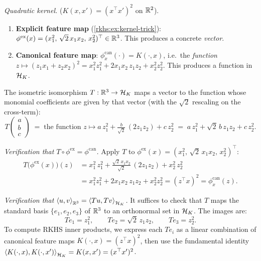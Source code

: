 \begin{notechapter}
\begin{intuition}
\medskip
\emph{Quadratic kernel.}
($K(x,x') = (x^\top x')^2$ on $\mathbb{R}^2$).
\begin{enumerate}
  \item \textbf{Explicit feature map}
    (\cref{rkhs:ex:kernel-trick}):
    $\phi^{\mathrm{ex}}(x) =
    (x_1^2,\, \sqrt{2}\,x_1 x_2,\, x_2^2)^\top
    \in \mathbb{R}^3$.
    This produces a concrete \emph{vector}.
  \item \textbf{Canonical feature map}:
    $\phi_x^{\mathrm{can}}(\cdot) = K(\cdot, x)$,
    i.e.\ the \emph{function}
    $z \mapsto (z_1 x_1 + z_2 x_2)^2
    = x_1^2 z_1^2 + 2x_1 x_2\, z_1 z_2
    + x_2^2 z_2^2$.
    This produces a function in $\mathcal{H}_K$.
\end{enumerate}
The isometric isomorphism $T: \mathbb{R}^3 \to \mathcal{H}_K$ maps
a vector to the function whose monomial coefficients
are given by that vector (with the $\sqrt{2}$
rescaling on the cross-term):
\[
T\!\begin{pmatrix} a \\ b \\ c \end{pmatrix}
\;=\; \text{the function } z \mapsto
a\,z_1^2 + \tfrac{b}{\sqrt{2}}\,(2z_1 z_2)
+ c\,z_2^2
\;=\; a\,z_1^2 + \sqrt{2}\,b\, z_1 z_2
+ c\,z_2^2.
\]

\emph{Verification that
$T \circ \phi^{\mathrm{ex}} = \phi^{\mathrm{can}}$.}
Apply $T$ to $\phi^{\mathrm{ex}}(x) =
(x_1^2,\, \sqrt{2}\,x_1 x_2,\, x_2^2)^\top$:
\begin{align*}
T\!\bigl(\phi^{\mathrm{ex}}(x)\bigr)(z)
&= x_1^2\, z_1^2
+ \tfrac{\sqrt{2}\,x_1 x_2}{\sqrt{2}}\,(2z_1 z_2)
+ x_2^2\, z_2^2\\
&= x_1^2 z_1^2 + 2x_1 x_2\, z_1 z_2
+ x_2^2 z_2^2
= (z^\top x)^2 = \phi_x^{\mathrm{can}}(z).
\end{align*}

\emph{Verification that $\left\langle u, v \right\rangle_{\mathbb{R}^3} =
\left\langle Tu, Tv \right\rangle_{\mathcal{H}_K}$.} It suffices to check that $T$
maps the standard basis $\{e_1, e_2, e_3\}$ of $\mathbb{R}^3$
to an orthonormal set in $\mathcal{H}_K$. The images are:
\[
Te_1 = z_1^2, \qquad
Te_2 = \sqrt{2}\,z_1 z_2, \qquad
Te_3 = z_2^2.
\]
To compute RKHS inner products, we express each $Te_i$
as a linear combination of canonical feature maps
$K(\cdot, x) = (z^\top x)^2$, then use the fundamental
identity
$\left\langle K(\cdot,x), K(\cdot,x') \right\rangle_{\mathcal{H}_K} = K(x,x')
= (x^\top x')^2$.


\end{intuition}
\end{notechapter}
